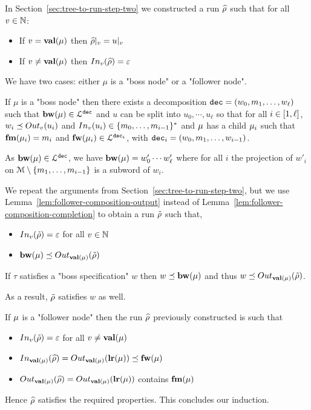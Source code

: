 In Section~\ref{sec:tree-to-run-step-two} we constructed a run $\widehat{\run}$ such that for all $v \in \nats$:
\begin{itemize}
	\item If $v = \valuelabel{\node}$ then $\vproj{v}{\widehat{\run}} = \vproj{v}{u}$
	
	\item If $v \neq \valuelabel{\node}$ then $\vinput{v}{\widehat{\run}} = \epsilon$
\end{itemize}  

We have two cases: either $\mu$ is a "boss node" or a "follower node".

If $\mu$ is a "boss node" then there exists a decomposition $\decsymb=(w_0, m_1, \ldots, w_\ell)$ such that $\bosslabel{\node} \in \langdec{\decsymb}$ and $u$ can be split into $u_0, \cdots, u_\ell$ so that for all $i \in \nset{1}{\ell}$, $w_i \subword \voutput{v}{u_i}$ and $\vinput{v}{u_i} \in \set{m_0, \ldots, m_{i-1}}^*$ and $\node$ has a child $\node_i$ such that $\followlabelmessage{\mu_i} = m_i$ and $\followlabelword{\node_i} \in \langdec{\decsymb_i}$, with $\decsymb_i = (w_0, m_1, \ldots, w_{i-1})$.

As $\bosslabel{\node} \in \langdec{\decsymb}$, we have $\bosslabel{\node} = w'_0 \cdots w'_\ell$ where for all $i$ the projection of $w'_i$ on $\messages\setminus\set{m_1, \ldots, m_{i-1}}$ is a subword of $w_i$. 

We repeat the arguments from Section~\ref{sec:tree-to-run-step-two}, but we use Lemma~\ref{lem:follower-composition-output} instead of Lemma~\ref{lem:follower-composition-completion} to obtain a run $\Tilde{\run}$ such that,
\begin{itemize}	
	\item $\vinput{v}{\Tilde{\run}} = \epsilon$ for all $v \in \nats$
	
	\item $\bosslabel{\node} \subword \voutput{\valuelabel{\node}}{\Tilde{\run}}$
\end{itemize}

If $\tau$ satisfies a "boss specification" $w$  then $w \subword \bosslabel{\node} $ and thus $w \subword \voutput{\valuelabel{\node}}{\Tilde{\run}}$.

As a result, $\Tilde{\run}$ satisfies $w$ as well.

If $\node$ is a "follower node" then the run $\widehat{\run}$ previously constructed is such that  

\begin{itemize}	
	\item $\vinput{v}{\Tilde{\run}} = \epsilon$ for all $v \neq \valuelabel{\node}$
	
	\item $\vinput{\valuelabel{\node}}{\widehat{\run}} = \voutput{\valuelabel{\node}}{\localrunlabel{\node}} \subword \followlabelword{\node}$
	
	\item $\voutput{\valuelabel{\node}}{\widehat{\run}} = \voutput{\valuelabel{\node}}{\localrunlabel{\node}}$ contains $\followlabelmessage{\node}$
\end{itemize}

Hence $\widehat{\run}$ satisfies the required properties.
This concludes our induction.
